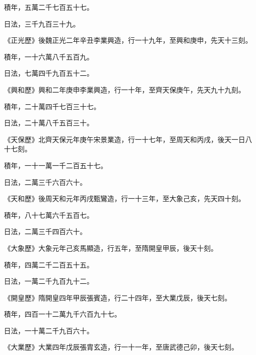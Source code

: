 \begin{pinyinscope}
 積年，五萬二千七百五十七。



 日法，三千九百三十九。



 《正光歷》後魏正光二年辛丑李業興造，行一十九年，至興和庚申，先天十三刻。



 積年，一十六萬八千五百九。



 日法，七萬四千九百五十二。



 《興和歷》興和二年庚申李業興造，行一十年，至齊天保庚午，先天九十九刻。



 積年，二十萬四千七百三十七。



 日法，二十萬八千五百三十。



 《天保歷》北齊天保元年庚午宋景業造，行一十七年，至周天和丙戌，後天一日八十七刻。



 積年，一十一萬一千二百五十七。



 日法，二萬三千六百六十。



 《天和歷》後周天和元年丙戌甄鸞造，行一十三年，至大象己亥，先天四十刻。



 積年，八十七萬六千五百七。



 日法，二萬三千四百六十。



 《大象歷》大象元年己亥馬顯造，行五年，至隋開皇甲辰，後天十刻。



 積年，四萬二千二百五十五。



 日法，一萬二千九百九十二。



 《開皇歷》隋開皇四年甲辰張賓造，行二十四年，至大業戊辰，後天七刻。



 積年，四百一十二萬九千六百九十七。



 日法，一十萬二千九百六十。



 《大業歷》大業四年戊辰張胄玄造，行一十一年，至唐武德己卯，後天七刻。




\end{pinyinscope}
